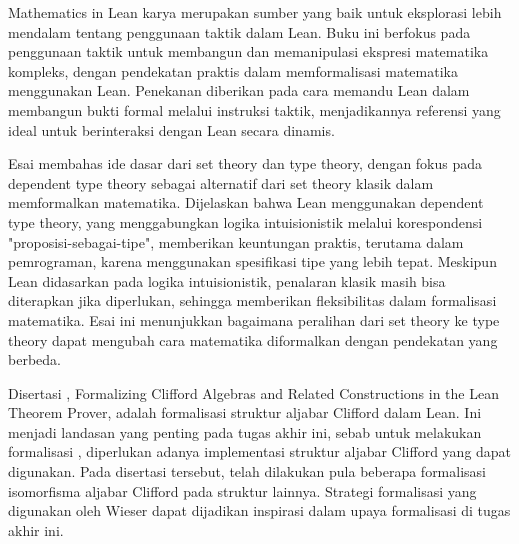 Mathematics in Lean karya \cite{Avigad2025} merupakan sumber yang baik untuk eksplorasi lebih mendalam tentang penggunaan taktik dalam Lean. Buku ini berfokus pada penggunaan taktik untuk membangun dan memanipulasi ekspresi matematika kompleks, dengan pendekatan praktis dalam memformalisasi matematika menggunakan Lean. Penekanan diberikan pada cara memandu Lean dalam membangun bukti formal melalui instruksi taktik, menjadikannya referensi yang ideal untuk berinteraksi dengan Lean secara dinamis.

Esai \cite{Palmer2020} membahas ide dasar dari set theory dan type theory, dengan fokus pada dependent type theory sebagai alternatif dari set theory klasik dalam memformalkan matematika. Dijelaskan bahwa Lean menggunakan dependent type theory, yang menggabungkan logika intuisionistik melalui korespondensi "proposisi-sebagai-tipe", memberikan keuntungan praktis, terutama dalam pemrograman, karena menggunakan spesifikasi tipe yang lebih tepat. Meskipun Lean didasarkan pada logika intuisionistik, penalaran klasik masih bisa diterapkan jika diperlukan, sehingga memberikan fleksibilitas dalam formalisasi matematika. Esai ini menunjukkan bagaimana peralihan dari set theory ke type theory dapat mengubah cara matematika diformalkan dengan pendekatan yang berbeda.

Disertasi \cite{Wieser2024}, Formalizing Clifford Algebras and Related Constructions in the Lean Theorem Prover, adalah formalisasi struktur aljabar Clifford dalam Lean. Ini menjadi landasan yang penting pada tugas akhir ini, sebab untuk melakukan formalisasi \icm{}, diperlukan adanya implementasi struktur aljabar Clifford yang dapat digunakan. Pada disertasi tersebut, telah dilakukan pula beberapa formalisasi isomorfisma aljabar Clifford pada struktur lainnya. Strategi formalisasi yang digunakan oleh Wieser dapat dijadikan inspirasi dalam upaya formalisasi di tugas akhir ini.
